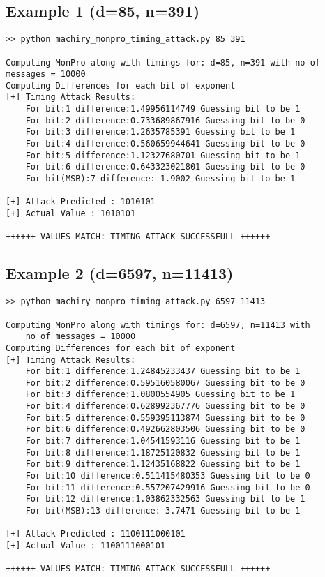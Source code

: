 \documentclass[11pt, pdftex]{article}
\begin{document}
\subsection{Example 1 (d=85, n=391)}
\begin{lstlisting}
>> python machiry_monpro_timing_attack.py 85 391

Computing MonPro along with timings for: d=85, n=391 with no of messages = 10000
Computing Differences for each bit of exponent
[+] Timing Attack Results:
    For bit:1 difference:1.49956114749 Guessing bit to be 1
    For bit:2 difference:0.733689867916 Guessing bit to be 0
    For bit:3 difference:1.2635785391 Guessing bit to be 1
    For bit:4 difference:0.560659944641 Guessing bit to be 0
    For bit:5 difference:1.12327680701 Guessing bit to be 1
    For bit:6 difference:0.643323021801 Guessing bit to be 0
    For bit(MSB):7 difference:-1.9002 Guessing bit to be 1

[+] Attack Predicted : 1010101
[+] Actual Value : 1010101

++++++ VALUES MATCH: TIMING ATTACK SUCCESSFULL ++++++

\end{lstlisting}
\subsection{Example 2 (d=6597, n=11413)}
\begin{lstlisting}
>> python machiry_monpro_timing_attack.py 6597 11413

Computing MonPro along with timings for: d=6597, n=11413 with 
    no of messages = 10000
Computing Differences for each bit of exponent
[+] Timing Attack Results:
    For bit:1 difference:1.24845233437 Guessing bit to be 1
    For bit:2 difference:0.595160580067 Guessing bit to be 0
    For bit:3 difference:1.0800554905 Guessing bit to be 1
    For bit:4 difference:0.628992367776 Guessing bit to be 0
    For bit:5 difference:0.559395113874 Guessing bit to be 0
    For bit:6 difference:0.492662803506 Guessing bit to be 0
    For bit:7 difference:1.04541593116 Guessing bit to be 1
    For bit:8 difference:1.18725120832 Guessing bit to be 1
    For bit:9 difference:1.12435168822 Guessing bit to be 1
    For bit:10 difference:0.511415480353 Guessing bit to be 0
    For bit:11 difference:0.557207429916 Guessing bit to be 0
    For bit:12 difference:1.03862332563 Guessing bit to be 1
    For bit(MSB):13 difference:-3.7471 Guessing bit to be 1

[+] Attack Predicted : 1100111000101
[+] Actual Value : 1100111000101

++++++ VALUES MATCH: TIMING ATTACK SUCCESSFULL ++++++
\end{lstlisting}
\end{document}
